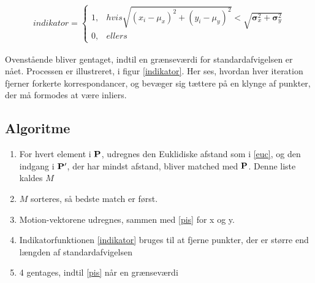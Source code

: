 \begin{equation}
\begin{split}
indikator = 
\begin{cases}
1,&hvis \sqrt{(x_i - \mu_x)^2 + (y_i - \mu_y)^2} < \sqrt{\boldsymbol\sigma_x^2 + \boldsymbol\sigma_y^2} \\
0,& ellers
\end{cases}
\end{split}
\label{indikator}
\end{equation}

Ovenstående bliver gentaget, indtil en grænseværdi for standardafvigelsen er nået. Processen er illustreret, i figur \eqref{indikator}. Her ses, hvordan hver iteration fjerner forkerte korrespondancer, og bevæger sig tættere på en klynge af punkter, der må formodes at være inliers.
\subsection*{Algoritme}
\begin{enumerate}
\item{For hvert element i $\bold{P}$, udregnes den Euklidiske afstand som i \eqref{euc}, og den indgang i $\bold{P}'$, der har mindst afstand, bliver matched med $\bold{P}$. Denne liste kaldes $M$}
\item{$M$ sorteres, så bedste match er først.}
\item{Motion-vektorene udregnes, sammen med \eqref{pis} for x og y.}
\item{Indikatorfunktionen \eqref{indikator} bruges til at fjerne punkter, der er større end længden af standardafvigelsen}
\item{4 gentages, indtil \eqref{pis} når en grænseværdi}
\end{enumerate}